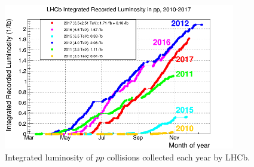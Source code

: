 \begin{figure}[htbp]
  \begin{center}
    \includegraphics[width=0.9\textwidth]{02LHCb/figs/Luminosity.png}
  \end{center}
  \vspace{-2mm}
  \caption{Integrated luminosity of $pp$ collisions collected each year by LHCb.}
  \label{fig:luminosity}
\end{figure} 
